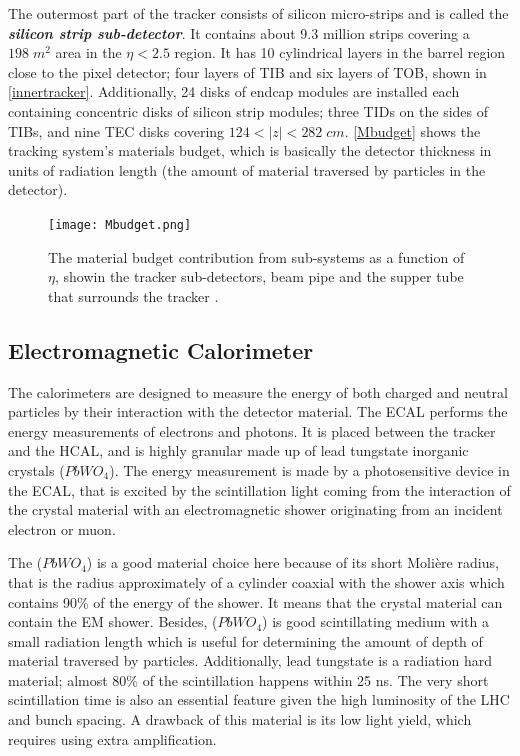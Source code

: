 The outermost part of the tracker consists of silicon micro-strips and is called the \textbf{\emph{silicon strip sub-detector}}. It contains about 9.3 million strips covering a $198\;m^2$ area in the $\eta < 2.5$ region. It has 10 cylindrical layers in the barrel region close to the pixel detector; four layers of TIB and six layers of TOB, shown in \autoref{innertracker}. Additionally, 24 disks of endcap modules are installed each containing concentric disks of silicon strip modules; three TIDs on the sides of TIBs, and nine TEC disks covering $124<|z|<282\;cm$. \autoref{Mbudget} shows the tracking system's materials budget, which is basically the detector thickness in units of radiation length (the amount of material traversed by particles in the detector).

\begin{figure}[ht]
	\centering
	\texttt{[image: Mbudget.png]}
	\vspace{2mm}
	\caption[The material budget contribution from sub-systems as a function of $\eta$, showin the tracker sub-detectors, beam pipe and the supper tube that surrounds the tracker.]{The material budget contribution from sub-systems as a function of $\eta$, showin the tracker sub-detectors, beam pipe and the supper tube that surrounds the tracker \cite{Mbudget}.}
	\label{Mbudget}
\end{figure}

\subsection{Electromagnetic Calorimeter}

The calorimeters are designed to measure the energy of both charged and neutral particles by their interaction with the detector material. The ECAL \cite{CERN-LHCC-97-033} performs the energy measurements of electrons and photons. It is placed between the tracker and the HCAL, and is highly granular made up of lead tungstate inorganic crystals ($PbWO_4$). The energy measurement is made by a photosensitive device in the ECAL, that is excited by the scintillation light coming from the interaction of the crystal material with an electromagnetic shower originating from an incident electron or muon.

The ($PbWO_4$) is a good material choice here because of its short Moli\`ere radius, that is the radius approximately of a cylinder coaxial with the shower axis which contains 90\% of the energy of the shower. It means that the crystal material can contain the EM shower. Besides, ($PbWO_4$) is good scintillating medium with a small radiation length which is useful for determining the amount of depth of material traversed by particles. Additionally, lead tungstate is a radiation hard material; almost 80\% of the scintillation happens within 25 ns. The very short scintillation time is also an essential feature given the high luminosity of the LHC and bunch spacing. A drawback of this material is its low light yield, which requires using extra amplification.

